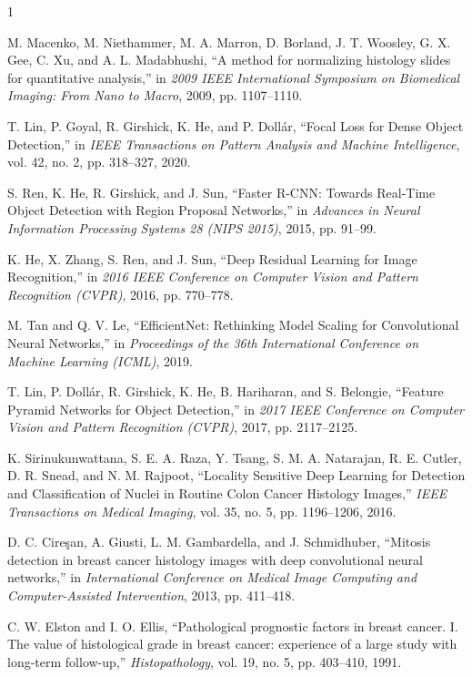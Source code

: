\documentclass[journal]{IEEEtran}
\begin{document}
\begin{thebibliography}{1}

M. Macenko, M. Niethammer, M. A. Marron, D. Borland, J. T. Woosley, G. X. Gee, C. Xu, and A. L. Madabhushi, ``A method for normalizing histology slides for quantitative analysis,'' in \textit{2009 IEEE International Symposium on Biomedical Imaging: From Nano to Macro}, 2009, pp. 1107--1110.

T. Lin, P. Goyal, R. Girshick, K. He, and P. Dollár, ``Focal Loss for Dense Object Detection,'' in \textit{IEEE Transactions on Pattern Analysis and Machine Intelligence}, vol. 42, no. 2, pp. 318--327, 2020.

S. Ren, K. He, R. Girshick, and J. Sun, ``Faster R-CNN: Towards Real-Time Object Detection with Region Proposal Networks,'' in \textit{Advances in Neural Information Processing Systems 28 (NIPS 2015)}, 2015, pp. 91--99.

K. He, X. Zhang, S. Ren, and J. Sun, ``Deep Residual Learning for Image Recognition,'' in \textit{2016 IEEE Conference on Computer Vision and Pattern Recognition (CVPR)}, 2016, pp. 770--778.

M. Tan and Q. V. Le, ``EfficientNet: Rethinking Model Scaling for Convolutional Neural Networks,'' in \textit{Proceedings of the 36th International Conference on Machine Learning (ICML)}, 2019.

T. Lin, P. Dollár, R. Girshick, K. He, B. Hariharan, and S. Belongie, ``Feature Pyramid Networks for Object Detection,'' in \textit{2017 IEEE Conference on Computer Vision and Pattern Recognition (CVPR)}, 2017, pp. 2117--2125.

K. Sirinukunwattana, S. E. A. Raza, Y. Tsang, S. M. A. Natarajan, R. E. Cutler, D. R. Snead, and N. M. Rajpoot, ``Locality Sensitive Deep Learning for Detection and Classification of Nuclei in Routine Colon Cancer Histology Images,'' \textit{IEEE Transactions on Medical Imaging}, vol. 35, no. 5, pp. 1196--1206, 2016.

D. C. Cireşan, A. Giusti, L. M. Gambardella, and J. Schmidhuber, ``Mitosis detection in breast cancer histology images with deep convolutional neural networks,'' in \textit{International Conference on Medical Image Computing and Computer-Assisted Intervention}, 2013, pp. 411--418.

C. W. Elston and I. O. Ellis, ``Pathological prognostic factors in breast cancer. I. The value of histological grade in breast cancer: experience of a large study with long-term follow-up,'' \textit{Histopathology}, vol. 19, no. 5, pp. 403--410, 1991.


\end{thebibliography}
\end{document}
